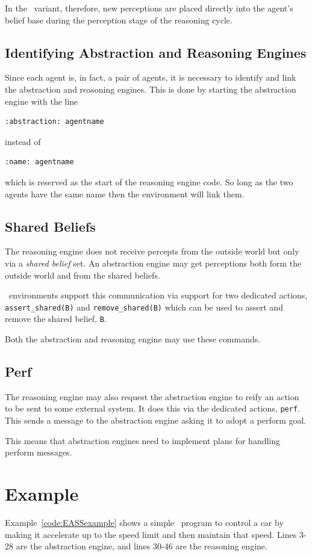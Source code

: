 In the \eass\ variant, therefore, new perceptions are placed directly into the agent's belief base during the perception stage of the reasoning cycle.

\subsection{Identifying Abstraction and Reasoning Engines}
Since each agent is, in fact, a pair of agents, it is necessary to identify and link the abstraction and reasoning engines.  This is done by starting the abstraction engine with the line
\begin{verbatim}
:abstraction: agentname
\end{verbatim} 
instead of 
\begin{verbatim}
:name: agentname
\end{verbatim} 
which is reserved as the start of the reasoning engine code.  So long as the two agents have the same name then the environment will link them.

\subsection{Shared Beliefs}
The reasoning engine does not receive percepts from the outside world but only via a \emph{shared belief} set.  An abstraction engine may get perceptions both form the outside world and from the shared beliefs.

\eass\ environments support this communication via support for two dedicated actions, \lstinline{assert_shared(B)} and \lstinline{remove_shared(B)} which can be used to assert and remove the shared belief, \lstinline{B}.

Both the abstraction and reasoning engine may use these commands.

\subsection{Perf}
The reasoning engine may also request the abstraction engine to reify an action to be sent to some external system.  It does this via the dedicated actions, \texttt{perf}.  This sends a message to the abstraction engine asking it to adopt a perform goal.

This means that abstraction engines need to implement plans for handling perform messages.

\section{Example}
Example~\ref{code:EASSexample} shows a simple \eass\ program to control a car by making it accelerate up to the speed limit and then maintain that speed.  Lines 3-28 are the abstraction engine, and lines 30-46 are the reasoning engine.

